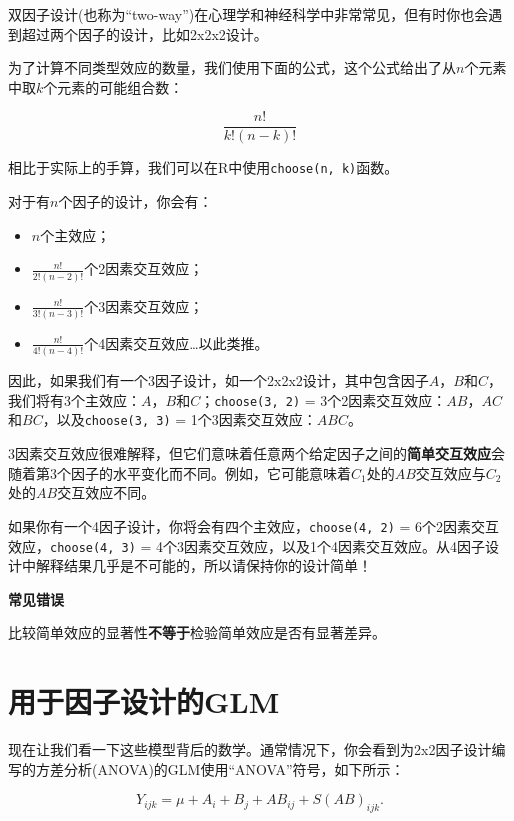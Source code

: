 \documentclass[
]{book}
\providecommand{\tightlist}{%
  \setlength{\itemsep}{0pt}\setlength{\parskip}{0pt}}
\begin{document}
双因子设计(也称为``two-way'')在心理学和神经科学中非常常见，但有时你也会遇到超过两个因子的设计，比如2x2x2设计。

为了计算不同类型效应的数量，我们使用下面的公式，这个公式给出了从\(n\)个元素中取\(k\)个元素的可能组合数：

\[\frac{n!}{k!(n - k)!}\]

相比于实际上的手算，我们可以在R中使用\texttt{choose(n,\ k)}函数。

对于有\(n\)个因子的设计，你会有：

\begin{itemize}
\tightlist
\item
  \(n\)个主效应；
\item
  \(\frac{n!}{2!(n - 2)!}\)个2因素交互效应；
\item
  \(\frac{n!}{3!(n - 3)!}\)个3因素交互效应；
\item
  \(\frac{n!}{4!(n - 4)!}\)个4因素交互效应\ldots 以此类推。
\end{itemize}

因此，如果我们有一个3因子设计，如一个2x2x2设计，其中包含因子\(A\)，\(B\)和\(C\)，我们将有3个主效应：\(A\)，\(B\)和\(C\)；\texttt{choose(3,\ 2)} = 3个2因素交互效应：\(AB\)，\(AC\)和\(BC\)，以及\texttt{choose(3,\ 3)} = 1个3因素交互效应：\(ABC\)。

3因素交互效应很难解释，但它们意味着任意两个给定因子之间的\textbf{简单交互效应}会随着第3个因子的水平变化而不同。例如，它可能意味着\(C_1\)处的\(AB\)交互效应与\(C_2\)处的\(AB\)交互效应不同。

如果你有一个4因子设计，你将会有四个主效应，\texttt{choose(4,\ 2)} = 6个2因素交互效应，\texttt{choose(4,\ 3)} = 4个3因素交互效应，以及1个4因素交互效应。从4因子设计中解释结果几乎是不可能的，所以请保持你的设计简单！

\textbf{常见错误}

比较简单效应的显著性\textbf{不等于}检验简单效应是否有显著差异。

\hypertarget{ux7528ux4e8eux56e0ux5b50ux8bbeux8ba1ux7684glm}{%
\section{用于因子设计的GLM}\label{ux7528ux4e8eux56e0ux5b50ux8bbeux8ba1ux7684glm}}

现在让我们看一下这些模型背后的数学。通常情况下，你会看到为2x2因子设计编写的方差分析(ANOVA)的GLM使用``ANOVA''符号，如下所示：

\[Y_{ijk} = \mu + A_i + B_j + AB_{ij} + S(AB)_{ijk}.\]
\end{document}
